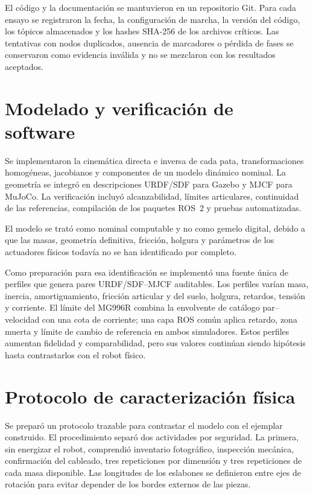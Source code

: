 El código y la documentación se mantuvieron en un repositorio Git. Para cada
ensayo se registraron la fecha, la configuración de marcha, la versión del
código, los tópicos almacenados y los hashes SHA-256 de los archivos críticos.
Las tentativas con nodos duplicados, ausencia de marcadores o pérdida de fases
se conservaron como evidencia inválida y no se mezclaron con los resultados
aceptados.

\section{Modelado y verificación de software}

Se implementaron la cinemática directa e inversa de cada pata, transformaciones
homogéneas, jacobianos y componentes de un modelo dinámico nominal. La geometría
se integró en descripciones URDF/SDF para Gazebo y MJCF para MuJoCo. La
verificación incluyó alcanzabilidad, límites articulares, continuidad de las
referencias, compilación de los paquetes ROS~2 y pruebas automatizadas.

El modelo se trató como nominal computable y no como gemelo digital, debido a
que las masas, geometría definitiva, fricción, holgura y parámetros de los
actuadores físicos todavía no se han identificado por completo.

Como preparación para esa identificación se implementó una fuente única de
perfiles que genera pares URDF/SDF--MJCF auditables. Los perfiles varían masa,
inercia, amortiguamiento, fricción articular y del suelo, holgura, retardos,
tensión y corriente. El límite del MG996R combina la envolvente de catálogo
par--velocidad con una cota de corriente; una capa ROS común aplica retardo,
zona muerta y límite de cambio de referencia en ambos simuladores. Estos
perfiles aumentan fidelidad y comparabilidad, pero sus valores continúan siendo
hipótesis hasta contrastarlos con el robot físico.

\section{Protocolo de caracterización física}

Se preparó un protocolo trazable para contrastar el modelo con el ejemplar
construido. El procedimiento separó dos actividades por seguridad. La primera,
sin energizar el robot, comprendió inventario fotográfico, inspección mecánica,
confirmación del cableado, tres repeticiones por dimensión y tres repeticiones
de cada masa disponible. Las longitudes de los eslabones se definieron entre
ejes de rotación para evitar depender de los bordes externos de las piezas.

